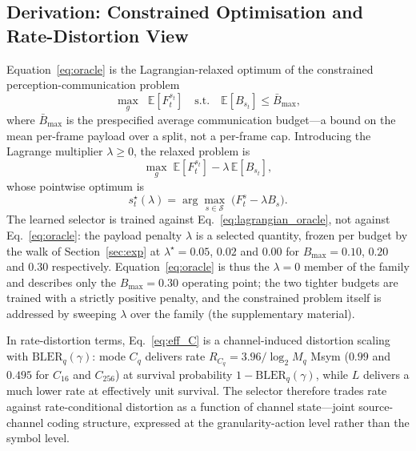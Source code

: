 \documentclass[journal]{IEEEtran}
\begin{document}
\subsection{Derivation: Constrained Optimisation and Rate-Distortion View}\label{sec:derivation}

Equation~\eqref{eq:oracle} is the Lagrangian-relaxed optimum of the constrained perception-communication problem
\begin{equation}
\max_g \;\;\mathbb{E}\!\left[F_t^{s_t}\right] \quad \text{s.t.} \quad \mathbb{E}\!\left[B_{s_t}\right] \le \bar B_{\max},
\label{eq:constrained}
\end{equation}
where $\bar B_{\max}$ is the prespecified average communication budget---a bound on the mean per-frame payload over a split, not a per-frame cap. Introducing the Lagrange multiplier $\lambda \ge 0$, the relaxed problem is
\begin{equation}
\max_g \;\mathbb{E}\!\left[F_t^{s_t}\right] - \lambda\,\mathbb{E}\!\left[B_{s_t}\right],
\end{equation}
whose pointwise optimum is
\begin{equation}
s_t^\star(\lambda) = \arg\max_{s \in \mathcal{S}}\; \bigl(F_t^s - \lambda B_s\bigr).
\label{eq:lagrangian_oracle}
\end{equation}
The learned selector is trained against Eq.~\eqref{eq:lagrangian_oracle}, not against Eq.~\eqref{eq:oracle}: the payload penalty $\lambda$ is a selected quantity, frozen per budget by the walk of Section~\ref{sec:exp} at $\lambda^\star = 0.05$, $0.02$ and $0.00$ for $B_{\max} = 0.10$, $0.20$ and $0.30$ respectively. Equation~\eqref{eq:oracle} is thus the $\lambda = 0$ member of the family and describes only the $B_{\max}=0.30$ operating point; the two tighter budgets are trained with a strictly positive penalty, and the constrained problem itself is addressed by sweeping $\lambda$ over the family (the supplementary material).

In rate-distortion terms, Eq.~\eqref{eq:eff_C} is a channel-induced distortion scaling with $\mathrm{BLER}_q(\gamma)$: mode $C_q$ delivers rate $R_{C_q}=3.96/\log_2 M_q$ Msym ($0.99$ and $0.495$ for $C_{16}$ and $C_{256}$) at survival probability $1-\mathrm{BLER}_q(\gamma)$, while $L$ delivers a much lower rate at effectively unit survival. The selector therefore trades rate against rate-conditional distortion as a function of channel state---joint source-channel coding structure, expressed at the granularity-action level rather than the symbol level.
\end{document}
